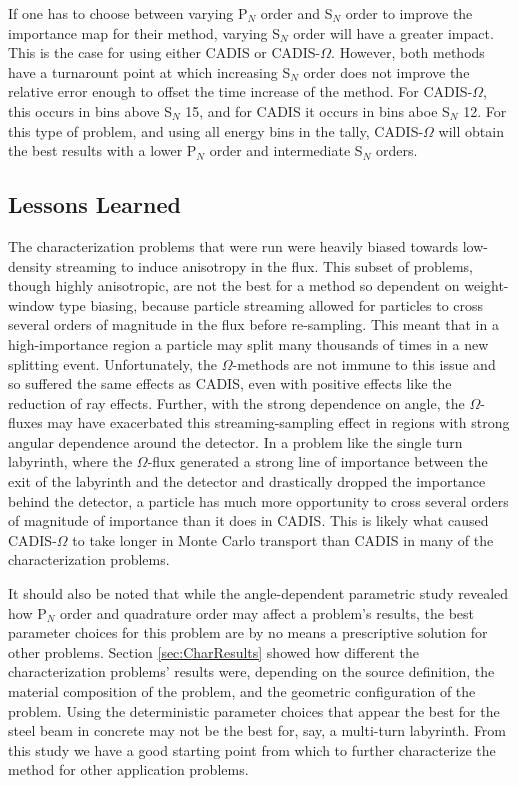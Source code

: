 If one has to choose between varying P$_N$ order and S$_N$ order to improve the
importance map for their method, varying S$_N$ order will have a greater impact.
This is the case for using either CADIS or CADIS-$\Omega$. However, both methods
have a turnarount point at which increasing S$_N$ order does not improve the
relative error enough to offset the time increase of the method. For
CADIS-$\Omega$, this occurs in bins above S$_N$ 15, and for CADIS it occurs in
bins aboe S$_N$ 12. For this type of problem, and using all energy bins in the
tally, CADIS-$\Omega$ will obtain the
best results with a lower P$_N$ order and intermediate S$_N$ orders.

\subsection{Lessons Learned}
\label{sec:lesslearn}

The characterization problems that were run were heavily biased towards
low-density streaming to induce anisotropy in the flux. This subset of
problems, though highly anisotropic, are not the best
for a method so dependent on weight-window type biasing,
because particle streaming allowed for particles to cross several orders of
magnitude in the flux before re-sampling. This meant that in a high-importance
region a particle may split many thousands of times in a new splitting event.
Unfortunately, the $\Omega$-methods are not immune to this issue and so suffered
the same effects as CADIS, even with positive effects like the reduction of ray
effects. Further, with the strong dependence on angle, the $\Omega$-fluxes may
have exacerbated this streaming-sampling effect in regions with strong angular
dependence around the detector. In a problem like the single turn labyrinth,
where the $\Omega$-flux generated a strong line of importance between the exit
of the labyrinth and the detector and drastically dropped the importance behind
the detector, a particle has much more opportunity to cross several orders of
magnitude of importance than it does in CADIS. This is likely what caused
CADIS-$\Omega$ to take longer in Monte Carlo transport than CADIS in many of the
characterization problems.

It should also be noted that while the angle-dependent parametric study revealed
how P$_N$ order and quadrature order may affect a problem's results, the
best parameter choices for this problem are by no means a prescriptive solution
for other problems. Section \ref{sec:CharResults}
showed how different the characterization problems' results were, depending on
the source definition, the material composition of the problem, and the
geometric configuration of the problem. Using the deterministic parameter
choices that appear the best for the steel beam in concrete may not be the best
for, say, a multi-turn labyrinth. From this study we have a good starting point
from which to further characterize the method for other application problems.

